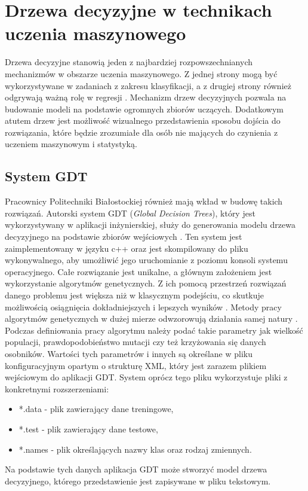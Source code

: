 \section{Drzewa decyzyjne w technikach uczenia maszynowego}

Drzewa decyzyjne stanowią jeden z najbardziej rozpowszechnianych mechanizmów w obszarze uczenia maszynowego. Z jednej strony mogą być wykorzystywane w zadaniach z zakresu klasyfikacji, a z drugiej strony również odgrywają ważną rolę w regresji \cite{book_1}. Mechanizm drzew decyzyjnych pozwala na budowanie modeli na podstawie ogromnych zbiorów uczących. Dodatkowym atutem drzew jest możliwość wizualnego przedstawienia sposobu dojścia do rozwiązania, które będzie zrozumiałe dla osób nie mających do czynienia z uczeniem maszynowym i statystyką.

\subsection{System GDT}
Pracownicy Politechniki Białostockiej również mają wkład w budowę takich rozwiązań. Autorski system GDT (\textit{Global Decision Trees}), który jest wykorzystywany w aplikacji inżynierskiej, służy do generowania modelu drzewa decyzyjnego na podstawie zbiorów wejściowych \cite{sgdt_1}. Ten system jest zaimplementowany w języku c++ oraz jest skompilowany do pliku wykonywalnego, aby umożliwić jego uruchomianie z poziomu konsoli systemu operacyjnego. Całe rozwiązanie jest unikalne, a głównym założeniem jest wykorzystanie algorytmów genetycznych. Z ich pomocą przestrzeń rozwiązań danego problemu jest większa niż w klasycznym podejściu, co skutkuje możliwością osiągnięcia dokładniejszych i lepszych wyników \cite{sgdt_2}. Metody pracy algorytmów genetycznych w dużej mierze odwzorowują działania samej natury \cite{book_2}. Podczas definiowania pracy algorytmu należy podać takie parametry jak wielkość populacji, prawdopodobieństwo mutacji czy też krzyżowania się danych osobników. Wartości tych parametrów i innych są określane w pliku konfiguracyjnym opartym o strukturę XML, który jest zarazem plikiem wejściowym do aplikacji GDT. System oprócz tego pliku wykorzystuje pliki z konkretnymi rozszerzeniami:
\begin{itemize}
	\item *.data - plik zawierający dane treningowe, 
	\item *.test - plik zawierający dane testowe,
	\item *.names - plik określających nazwy klas oraz rodzaj zmiennych.
\end{itemize}
Na podstawie tych danych aplikacja GDT może stworzyć model drzewa decyzyjnego, którego przedstawienie jest zapisywane w pliku tekstowym. 

